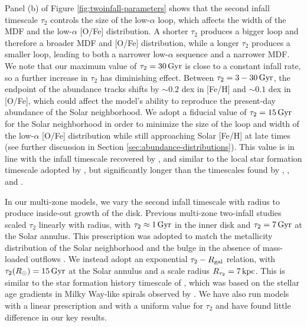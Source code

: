 \documentclass[twocolumn,twocolappendix,linenumbers]{aastex631}
\newcommand{\kpc}{\,{\rm kpc}}
\newcommand{\Gyr}{\,{\rm Gyr}}
\begin{document}
Panel (b) of Figure \ref{fig:twoinfall-parameters} shows that the second infall timescale $\tau_2$ controls the size of the low-$\alpha$ loop, which affects the width of the MDF and the low-$\alpha$ [O/Fe] distribution. A shorter $\tau_2$ produces a bigger loop and therefore a broader MDF and [O/Fe] distribution, while a longer $\tau_2$ produces a smaller loop, leading to both a narrower low-$\alpha$ sequence and a narrower MDF. We note that our maximum value of $\tau_2=30\,{\rm Gyr}$ is close to a constant infall rate, so a further increase in $\tau_2$ has diminishing effect. Between $\tau_2=3-30\,{\rm Gyr}$, the endpoint of the abundance tracks shifts by $\sim0.2$ dex in [Fe/H] and $\sim0.1$ dex in [O/Fe], which could affect the model's ability to reproduce the present-day abundance of the Solar neighborhood. We adopt a fiducial value of $\tau_2=15\,{\rm Gyr}$ for the Solar neighborhood in order to minimize the size of the loop and width of the low-$\alpha$ [O/Fe] distribution while still approaching Solar [Fe/H] at late times (see further discussion in Section \ref{sec:abundance-distributions}). This value is in line with the infall timescale recovered by \citet{spitoni_galactic_2020}, and similar to the local star formation timescale adopted by \citet{johnson_stellar_2021}, but significantly longer than the timescales found by \citet{nissen_high-precision_2020}, \citet{spitoni_apogee_2021}, and \citet{hegedus_reconstructing_2025}.

In our multi-zone models, we vary the second infall timescale with radius to produce inside-out growth of the disk. Previous multi-zone two-infall studies \citep[e.g.,][]{chiappini_abundance_2001,palla_chemical_2020} scaled $\tau_2$ linearly with radius, with $\tau_2\approx1\Gyr$ in the inner disk and $\tau_2=7\Gyr$ at the Solar annulus. This prescription was adopted to match the metallicity distribution of the Solar neighborhood and the bulge in the absence of mass-loaded outflows \citep{romano_mass_2000}. We instead adopt an exponential $\tau_2 - R_{\rm gal}$ relation, with $\tau_2(R_\odot)=15\Gyr$ at the Solar annulus and a scale radius $R_{\tau_2}=7\kpc$. This is similar to the star formation history timescale of \citet{johnson_stellar_2021}, which was based on the  stellar age gradients in Milky Way-like spirals observed by \citet{sanchez_spatially_2020}. We have also run models with a linear prescription and with a uniform value for $\tau_2$ and have found little difference in our key results.
\end{document}
